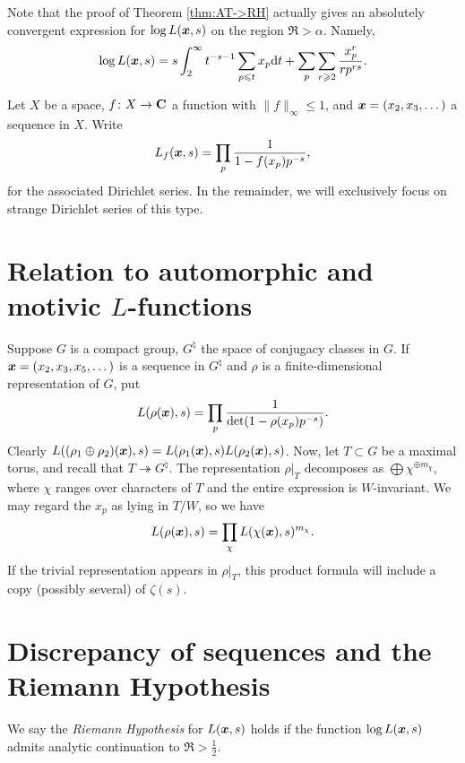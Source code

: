 Note that the proof of Theorem \ref{thm:AT->RH} actually gives an absolutely 
convergent expression for $\log L({\boldsymbol x},s)$ on the region $\Re >\alpha$. Namely, 
\[
	\log L({\boldsymbol x},s) = s \int_2^\infty t^{-s-1}\sum_{p\leqslant t} x_p \mathrm{d} t + \sum_p \sum_{r\geqslant 2} \frac{x_p^r}{r p^{r s}} . 
\]

Let $X$ be a space, $f\colon X\to \mathbf{C}$ a function with 
$\|f\|_\infty\leqslant 1$, and ${\boldsymbol x}=(x_2,x_3,\dots)$ a sequence in $X$. Write 
\[
	L_f({\boldsymbol x},s) = \prod_p \frac{1}{1-f(x_p) p^{-s}} ,
\]
for the associated Dirichlet series. In the remainder, we will 
exclusively focus on strange Dirichlet series of this type. 





\section{Relation to automorphic and motivic \texorpdfstring{$L$}{L}-functions}

Suppose $G$ is a compact group, $G^\natural$ the space of conjugacy classes in 
$G$. If ${\boldsymbol x} = (x_2,x_3,x_5,\dots)$ is a sequence in $G^\natural$ and $\rho$ is 
a finite-dimensional representation of $G$, put 
\[
	L(\rho({\boldsymbol x}),s) = \prod_p \frac{1}{\det(1-\rho(x_p) p^{-s})} .
\]
Clearly $L((\rho_1\oplus \rho_2)({\boldsymbol x}),s) = L(\rho_1({\boldsymbol x}),s) L(\rho_2({\boldsymbol x}),s)$. 
Now, let $T\subset G$ be a maximal torus, and recall that 
$T\twoheadrightarrow G^\natural$. The representation 
$\left.\rho\right|_T$ decomposes as $\bigoplus \chi^{\oplus m_\chi}$, where 
$\chi$ ranges over characters of $T$ and the entire expression is 
$W$-invariant. We may regard the $x_p$ as lying in $T/W$, so we have 
\[
	L(\rho({\boldsymbol x}),s) = \prod_\chi L(\chi({\boldsymbol x}),s)^{m_\chi} .
\]
If the trivial representation appears in $\left.\rho\right|_T$, this product 
formula will include a copy (possibly several) of $\zeta(s)$. 





\section{Discrepancy of sequences and the Riemann Hypothesis}

\begin{definition}
We say the \emph{Riemann Hypothesis} for $L({\boldsymbol x},s)$ holds if the function 
$\log L({\boldsymbol x},s)$ admits analytic continuation to $\Re > \frac 1 2$. 
\end{definition}


